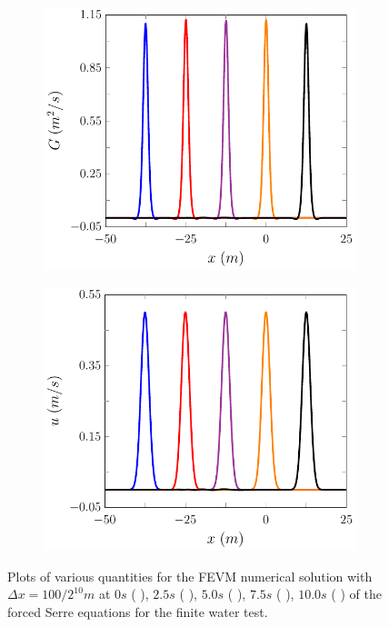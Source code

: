 \begin{figure}
\begin{subfigure}{0.5\textwidth}
		\vspace{0.5cm}
	\end{subfigure}
	\begin{subfigure}{0.5\textwidth}
		\includegraphics[width=\textwidth]{./chp5/figures/Forced/Wet/FEVMG.pdf}
		\vspace{0.5cm}
	\end{subfigure}%
	\begin{subfigure}{0.5\textwidth}
		\includegraphics[width=\textwidth]{./chp5/figures/Forced/Wet/FEVMu.pdf}
		\vspace{0.5cm}
	\end{subfigure}
	\caption{Plots of various quantities for the FEVM numerical solution with $\Delta x = 100/ 2^{10} m$ at $0s$ ({\color{blue} \solidrule}), $2.5s$ ({\color{red} \solidrule}), $5.0s$ ({\color{violet!80!white} \solidrule}), $7.5s$ ({\color{orange} \solidrule}), $10.0s$ ({\color{black} \solidrule}) of the forced Serre equations for the finite water test.}
	\label{fig:ForcedWetFEVMP2PExAll}
\end{figure}

